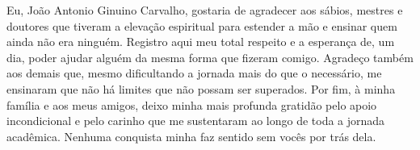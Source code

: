 
\begin{agradecimentos}
    Eu, João Antonio Ginuino Carvalho, gostaria de agradecer aos sábios, mestres e doutores que tiveram a elevação espiritual para estender a mão e ensinar quem ainda não era ninguém. Registro aqui meu total respeito e a esperança de, um dia, poder ajudar alguém da mesma forma que fizeram comigo. Agradeço também aos demais que, mesmo dificultando a jornada mais do que o necessário, me ensinaram que não há limites que não possam ser superados. Por fim, à minha família e aos meus amigos, deixo minha mais profunda gratidão pelo apoio incondicional e pelo carinho que me sustentaram ao longo de toda a jornada acadêmica. Nenhuma conquista minha faz sentido sem vocês por trás dela.
\end{agradecimentos}